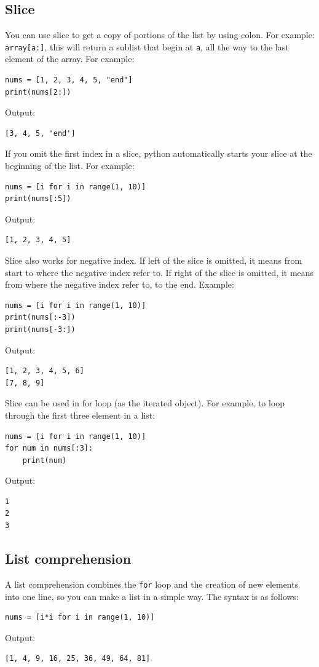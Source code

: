 \documentclass[12pt]{book}
\begin{document}
\subsection{Slice}
\label{sec:org54ca1d2}
You can use slice to get a copy of portions of the list by using colon. For example: \texttt{array[a:]}, this will return a sublist that begin at \texttt{a}, all the way to the last element of the array. For example:
\begin{verbatim}
nums = [1, 2, 3, 4, 5, "end"]
print(nums[2:])
\end{verbatim}
Output:
\begin{verbatim}
[3, 4, 5, 'end']
\end{verbatim}

If you omit the first index in a slice, python automatically starts your slice at the beginning of the list. For example:
\begin{verbatim}
nums = [i for i in range(1, 10)]
print(nums[:5])
\end{verbatim}
Output:
\begin{verbatim}
[1, 2, 3, 4, 5]
\end{verbatim}

Slice also works for negative index. If left of the slice is omitted, it means from start to where the negative index refer to. If right of the slice is omitted, it means from where the negative index refer to, to the end. Example:
\begin{verbatim}
nums = [i for i in range(1, 10)]
print(nums[:-3])
print(nums[-3:])
\end{verbatim}
Output:
\begin{verbatim}
[1, 2, 3, 4, 5, 6]
[7, 8, 9]
\end{verbatim}

Slice can be used in for loop (as the iterated object). For example, to loop through the first three element in a list:
\begin{verbatim}
nums = [i for i in range(1, 10)]
for num in nums[:3]:
    print(num)
\end{verbatim}
Output:
\begin{verbatim}
1
2
3
\end{verbatim}

\subsection{List comprehension \label{org9cb9ef6}}
\label{sec:orgd22ca17}
A list comprehension combines the \texttt{for} loop and the creation of new elements into one line, so you can make a list in a simple way. The syntax is as follows:
\begin{verbatim}
nums = [i*i for i in range(1, 10)]
\end{verbatim}
Output:
\begin{verbatim}
[1, 4, 9, 16, 25, 36, 49, 64, 81]
\end{verbatim}
\end{document}
